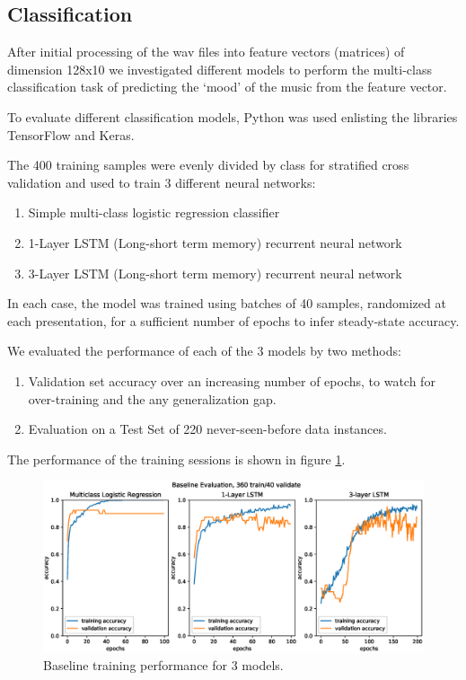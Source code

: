 \documentclass{article}
\begin{document}
\subsection{Classification}

After initial processing of the wav files into feature vectors (matrices) of dimension 128x10 we investigated different models to perform the multi-class classification task of predicting the ‘mood’ of the music from the feature vector.

To evaluate different classification models, Python was used enlisting the libraries TensorFlow\cite{tensorflow} and Keras\cite{keras}.

The 400 training samples were evenly divided by class for stratified cross validation and used to train 3 different neural networks:
\begin{enumerate}
\item Simple multi-class logistic regression classifier
\item 1-Layer LSTM (Long-short term memory) recurrent neural network
\item 3-Layer LSTM (Long-short term memory) recurrent neural network
\end{enumerate}
In each case, the model was trained using batches of 40 samples, randomized at each presentation, for a sufficient number of epochs to infer steady-state accuracy.

We evaluated the performance of each of the 3 models by two methods:
\begin{enumerate}
\item Validation set accuracy over an increasing number of epochs, to watch for over-training and the any generalization gap.
\item Evaluation on a Test Set of 220 never-seen-before data instances.
\end{enumerate}

The performance of the training sessions is shown in figure \ref{fig:baseline_train}.
\begin{figure}[]
	\centering
	\includegraphics[width=1.25\textwidth]{Baseline400.eps}  
	\caption{Baseline training performance for 3 models.}
	\label{fig:baseline_train}
\end{figure}
\end{document}

